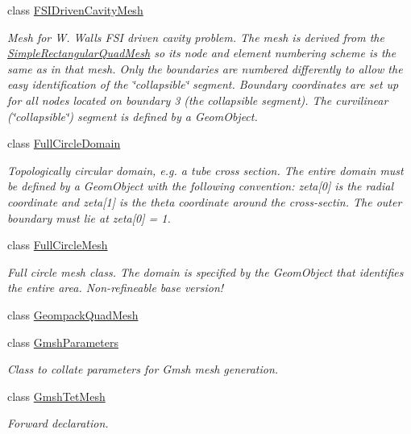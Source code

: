 \begin{DoxyCompactItemize}
class \hyperlink{classoomph_1_1FSIDrivenCavityMesh}{F\+S\+I\+Driven\+Cavity\+Mesh}
\begin{DoxyCompactList}\small\item\em Mesh for W. Wall\textquotesingle{}s F\+SI driven cavity problem. The mesh is derived from the {\ttfamily \hyperlink{classoomph_1_1SimpleRectangularQuadMesh}{Simple\+Rectangular\+Quad\+Mesh}} so it\textquotesingle{}s node and element numbering scheme is the same as in that mesh. Only the boundaries are numbered differently to allow the easy identification of the \char`\"{}collapsible\char`\"{} segment. Boundary coordinates are set up for all nodes located on boundary 3 (the collapsible segment). The curvilinear (\char`\"{}collapsible\char`\"{}) segment is defined by a {\ttfamily Geom\+Object}. \end{DoxyCompactList}\item 
class \hyperlink{classoomph_1_1FullCircleDomain}{Full\+Circle\+Domain}
\begin{DoxyCompactList}\small\item\em Topologically circular domain, e.\+g. a tube cross section. The entire domain must be defined by a Geom\+Object with the following convention\+: zeta\mbox{[}0\mbox{]} is the radial coordinate and zeta\mbox{[}1\mbox{]} is the theta coordinate around the cross-\/sectin. The outer boundary must lie at zeta\mbox{[}0\mbox{]} = 1. \end{DoxyCompactList}\item 
class \hyperlink{classoomph_1_1FullCircleMesh}{Full\+Circle\+Mesh}
\begin{DoxyCompactList}\small\item\em Full circle mesh class. The domain is specified by the Geom\+Object that identifies the entire area. Non-\/refineable base version! \end{DoxyCompactList}\item 
class \hyperlink{classoomph_1_1GeompackQuadMesh}{Geompack\+Quad\+Mesh}
\item 
class \hyperlink{classoomph_1_1GmshParameters}{Gmsh\+Parameters}
\begin{DoxyCompactList}\small\item\em Class to collate parameters for Gmsh mesh generation. \end{DoxyCompactList}\item 
class \hyperlink{classoomph_1_1GmshTetMesh}{Gmsh\+Tet\+Mesh}
\begin{DoxyCompactList}\small\item\em Forward declaration. \end{DoxyCompactList}\item 

\end{DoxyCompactItemize}
